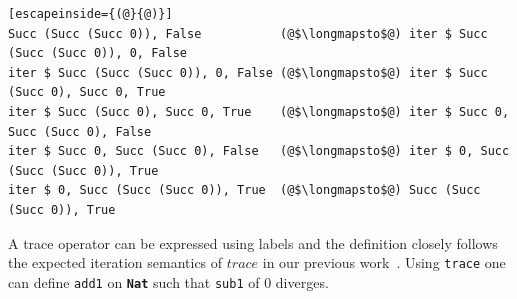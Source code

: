 \documentclass{article}
\newcommand{\kw}[1]{{\scriptsize{\textbf{\texttt{#1}}}}}
\newcommand{\ctr}[1]{{\scriptsize{\texttt{#1}}}}
\begin{document}
\begin{lstlisting}[escapeinside={(@}{@)}]
Succ (Succ (Succ 0)), False           (@$\longmapsto$@) iter $ Succ (Succ (Succ 0)), 0, False
iter $ Succ (Succ (Succ 0)), 0, False (@$\longmapsto$@) iter $ Succ (Succ 0), Succ 0, True
iter $ Succ (Succ 0), Succ 0, True    (@$\longmapsto$@) iter $ Succ 0, Succ (Succ 0), False
iter $ Succ 0, Succ (Succ 0), False   (@$\longmapsto$@) iter $ 0, Succ (Succ (Succ 0)), True
iter $ 0, Succ (Succ (Succ 0)), True  (@$\longmapsto$@) Succ (Succ (Succ 0)), True
 \end{lstlisting}

A trace operator can be expressed using labels and the definition closely
follows the expected iteration semantics of \ensuremath{\mathit{trace}} in our previous
work~\cite{James:2012:IE:2103656.2103667}.  Using \ctr{trace} one can define
\ctr{add1} on \kw{Nat} such that \ctr{sub1} of {\scriptsize{0}}
diverges.
\end{document}
